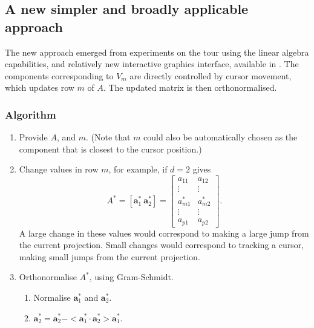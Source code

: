 \documentclass[]{interact}
\theoremstyle{plain}%
\theoremstyle{definition}
\theoremstyle{remark}
\providecommand{\tightlist}{%
  \setlength{\itemsep}{0pt}\setlength{\parskip}{0pt}}
\def\tightlist{}
\begin{document}
\hypertarget{a-new-simpler-and-broadly-applicable-approach}{%
\subsection{A new simpler and broadly applicable
approach}\label{a-new-simpler-and-broadly-applicable-approach}}

The new approach emerged from experiments on the tour using the linear
algebra capabilities, and relatively new interactive graphics interface,
available in \citet{Mathematica}. The components corresponding to
\(V_m\) are directly controlled by cursor movement, which updates row
\(m\) of \(A\). The updated matrix is then orthonormalised.

\hypertarget{algorithm}{%
\subsubsection{Algorithm}\label{algorithm}}

\begin{enumerate}
\def\labelenumi{\arabic{enumi}.}
\tightlist
\item
  Provide \(A\), and \(m\). (Note that \(m\) could also be automatically
  chosen as the component that is closest to the cursor position.)
\item
  Change values in row \(m\), for example, if \(d=2\) gives \[
  A^* = [ \boldsymbol{a}^*_1~\boldsymbol{a}^*_2 ] = \left[ \begin{array}{cc} a_{11} & a_{12}\\
                             \vdots & \vdots \\
                             a^*_{m1} & a^*_{m2}\\
                             \vdots & \vdots \\
                             a_{p1} & a_{p2} 
       \end{array}\right].
  \] \noindent A large change in these values would correspond to making
  a large jump from the current projection. Small changes would
  correspond to tracking a cursor, making small jumps from the current
  projection.
\item
  Orthonormalise \(A^*\), using Gram-Schmidt.

  \begin{enumerate}
  \def\labelenumii{\roman{enumii}.}
  \tightlist
  \item
    Normalise \(\boldsymbol{a}^*_1\) and \(\boldsymbol{a}^*_2\).
  \item
    \(\boldsymbol{a}^*_2 = \boldsymbol{a}^*_2 - <\boldsymbol{a}^*_1\cdot\boldsymbol{a}^*_2>\boldsymbol{a}^*_1\).
  \end{enumerate}
\end{enumerate}
\end{document}
